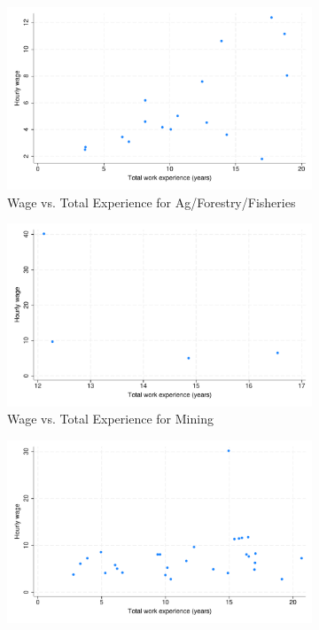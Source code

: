 \documentclass{article}
\begin{document}
\begin{figure}[H] 
\centering 
  \caption{Four Scatterplots of different variables vs. experience using the subfigure subcommand} 
\begin{subfigure}{.3\textwidth}
  \includegraphics[width = 1.00\textwidth]{./figures/scatter_wage_ind1.pdf}  
  \caption{Wage vs. Total Experience for Ag/Forestry/Fisheries}
\end{subfigure}
\begin{subfigure}{.3\textwidth}
  \includegraphics[width = 1.00\textwidth]{./figures/scatter_wage_ind2.pdf}  
  \caption{Wage vs. Total Experience for Mining}
\end{subfigure}
\begin{subfigure}{.3\textwidth}
  \includegraphics[width = 1.00\textwidth]{./figures/scatter_wage_ind3.pdf}  

\end{subfigure}
\end{figure}
\end{document}
